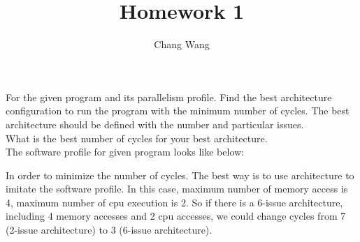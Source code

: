 \documentclass[12pt, a4paper]{report}
\title{Homework 1}
\author{Chang Wang}
\date{} %
\begin{document}
\maketitle

For the given program and its parallelism profile. Find the best architecture configuration to run the program with the minimum number of cycles. The best architecture should be defined with the number and particular issues. \\[0.2cm]
What is the best number of cycles for your best architecture. \\[0.5cm]

The software profile for given program looks like below: \\[0.5cm]
\begin{center}
\end{center}
In order to minimize the number of cycles. The best way is to use architecture to imitate the software profile. In this case, maximum number of memory access is 4, maximum number of cpu execution is 2. So if there is a 6-issue architecture, including 4 memory accesses and 2 cpu accesses, we could change cycles from 7 (2-issue architecture) to 3 (6-issue architecture).
\end{document}
